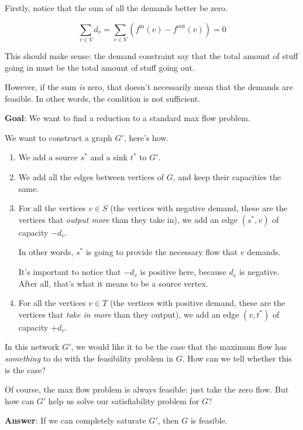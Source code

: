 \documentclass[12pt]{article}
\begin{document}
  Firstly, notice that the sum of all the demands better be zero.

  \[
    \sum_{v \in V} d_v = \sum_{v \in V} \left(f^\text{in}(v) - f^\text{out}(v)\right) = 0
  \]

  This should make sense: the demand constraint say that the total amount of
  stuff going in must be the total amount of stuff going out.

  However, if the sum {\it is} zero, that doesn't necessarily mean that the
  demands are feasible. In other words, the condition is not sufficient.

  {\bf Goal}: We want to find a reduction to a standard max flow problem.

  We want to construct a graph $G'$, here's how.

  \begin{enumerate}
    \item We add a source $s^*$ and a sink $t^*$ to $G'$.

    \item We add all the edges between vertices of $G$, and keep their
      capacities the same.

    \item For all the vertices $v \in S$ (the vertices with negative demand,
      these are the vertices that {\it output more} than they take in), we add
      an edge $(s^*, v)$ of capacity $-d_v$.

      In other words, $s^*$ is going to provide the necessary
      flow that $v$ demands.

      It's important to notice that $-d_v$ is positive here, because $d_v$ is
      negative. After all, that's what it means to be a source vertex.

    \item For all the vertices $v \in T$ (the vertices with positive demand,
      these are the vertices that {\it take in more} than they output), we add
      an edge $(v, t^*)$ of capacity $+d_v$.
  \end{enumerate}

  In this network $G'$, we would like it to be the case that the maximum flow
  has {\it something} to do with the feasibility problem in $G$. How can we
  tell whether this is the case?

  Of course, the max flow problem is always feasible: just take the zero flow.
  But how can $G'$ help us solve our satisfiability problem for $G$?

  {\bf Answer}: If we can completely saturate $G'$, then $G$ is feasible.
\end{document}
